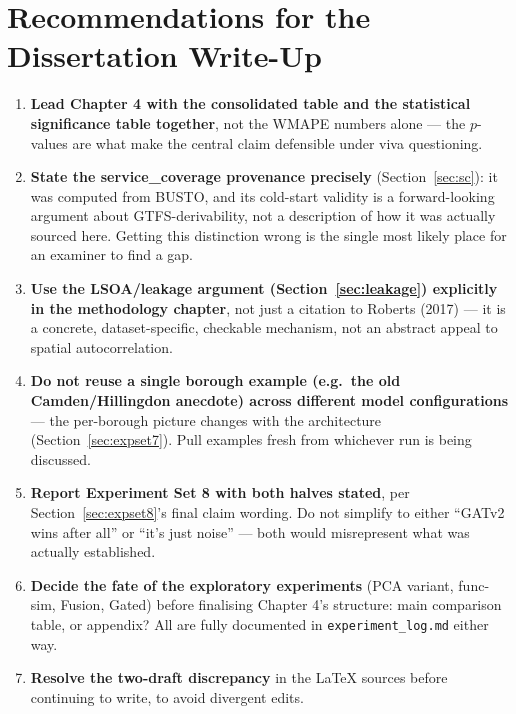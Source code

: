 \documentclass[11pt]{article}
\let\oldsection\section
\renewcommand{\section}[1]{\clearpage\oldsection{\color{sectcolor}#1}}
\begin{document}
\newpage
\section{Recommendations for the Dissertation Write-Up}
\begin{enumerate}
\item \textbf{Lead Chapter 4 with the consolidated table and the statistical significance
table together}, not the WMAPE numbers alone --- the $p$-values are what make the central
claim defensible under viva questioning.
\item \textbf{State the service\_coverage provenance precisely} (Section~\ref{sec:sc}): it
was computed from BUSTO, and its cold-start validity is a forward-looking argument about
GTFS-derivability, not a description of how it was actually sourced here. Getting this
distinction wrong is the single most likely place for an examiner to find a gap.
\item \textbf{Use the LSOA/leakage argument (Section~\ref{sec:leakage}) explicitly in the
methodology chapter}, not just a citation to Roberts (2017) --- it is a concrete,
dataset-specific, checkable mechanism, not an abstract appeal to spatial autocorrelation.
\item \textbf{Do not reuse a single borough example (e.g.\ the old Camden/Hillingdon
anecdote) across different model configurations} --- the per-borough picture changes with
the architecture (Section~\ref{sec:expset7}). Pull examples fresh from whichever run is
being discussed.
\item \textbf{Report Experiment Set 8 with both halves stated}, per Section~\ref{sec:expset8}'s
final claim wording. Do not simplify to either ``GATv2 wins after all'' or ``it's just
noise'' --- both would misrepresent what was actually established.
\item \textbf{Decide the fate of the exploratory experiments} (PCA variant, func-sim, Fusion,
Gated) before finalising Chapter 4's structure: main comparison table, or appendix? All are
fully documented in \texttt{experiment\_log.md} either way.
\item \textbf{Resolve the two-draft discrepancy} in the LaTeX sources before continuing to
write, to avoid divergent edits.
\end{enumerate}
\end{document}
